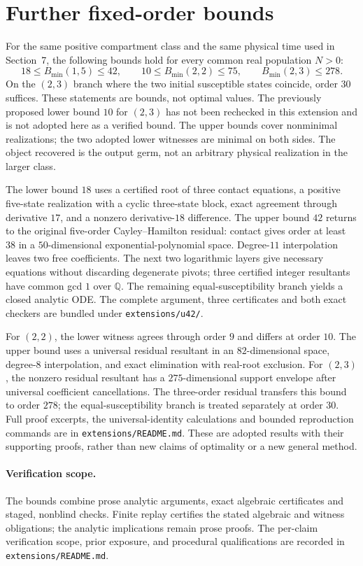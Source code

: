 \section{Further fixed-order bounds}\label{sec:fjextension}
For the same positive compartment class and the same physical time used
in Section~7, the following bounds hold for every common real population
$N>0$:
\[
18\le B_{\min}(1,5)\le42,\qquad
10\le B_{\min}(2,2)\le75,\qquad B_{\min}(2,3)\le278.
\]
On the $(2,3)$ branch where the two initial susceptible states coincide,
order $30$ suffices. These statements are bounds, not optimal values.
The previously proposed lower bound $10$ for $(2,3)$ has not been
rechecked in this extension and is not adopted here as a verified bound.
The upper bounds cover nonminimal realizations; the two adopted lower
witnesses are minimal on both sides. The object recovered is the output
germ, not an arbitrary physical realization in the larger class.

The lower bound $18$ uses a certified root of three contact equations,
a positive five-state realization with a cyclic three-state block,
exact agreement through derivative $17$, and a nonzero derivative-$18$
difference. The upper bound $42$ returns to the original five-order
Cayley--Hamilton residual: contact gives order at least $38$ in a
$50$-dimensional exponential-polynomial space. Degree-$11$
interpolation leaves two free coefficients. The next two logarithmic
layers give necessary equations without discarding degenerate pivots;
three certified integer resultants have common gcd $1$ over $\mathbb Q$.
The remaining equal-susceptibility branch yields a closed analytic ODE.
The complete argument, three certificates and both exact checkers are
bundled under \texttt{extensions/u42/}.

For $(2,2)$, the lower witness agrees through order $9$ and differs at
order $10$. The upper bound uses a universal residual resultant in an
$82$-dimensional space, degree-$8$ interpolation, and exact elimination
with real-root exclusion. For $(2,3)$, the nonzero residual resultant
has a $275$-dimensional support envelope after universal coefficient
cancellations. The three-order residual transfers this bound to order
$278$; the equal-susceptibility branch is treated separately at order
$30$. Full proof excerpts, the universal-identity calculations and
bounded reproduction commands are in \texttt{extensions/README.md}.
These are adopted results with their supporting proofs, rather than new
claims of optimality or a new general method.

\paragraph{Verification scope.}
The bounds combine prose analytic arguments, exact algebraic
certificates and staged, nonblind checks. Finite replay certifies the
stated algebraic and witness obligations; the analytic implications
remain prose proofs. The per-claim verification scope, prior exposure,
and procedural qualifications are recorded in
\texttt{extensions/README.md}.
